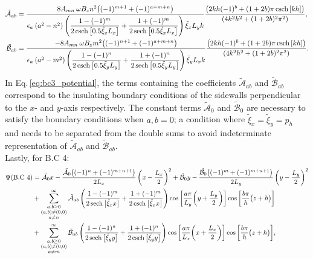 \documentclass[aps,prfluids,reprint,superscriptaddress]{revtex4-2}
\newcommand{\ii}[1]{\text{#1}}
\newcommand{\nn}{\nonumber}
\begin{document}
\begin{align}
	\tilde{\mathcal A}_{ab} & =  
	\frac{8A_{mn} \: \omega B_z n^2 \bigl( (-1)^{m+1} + (-1)^{a+m+n} \bigr)
	}
	{\epsilon_a \: (a^2-n^2)
	\left(
	\dfrac{1-(-1)^m}{2\csch{\bigl[0.5\tilde\xi_x L_x \bigr]}} + 
	\dfrac{1+(-1)^m}{2\sech{\bigl[0.5\tilde\xi_x L_x \bigr]}}
	\right)\tilde\xi_x L_y k
	}
	\frac{\left(
		2kh (-1)^b + (1+2b)\pi\csch{[kh]}
		\right)}
	{(4k^2h^2 + (1+2b)^2\pi^2)},
	\label{eq:bc3_A}
	\\
	\tilde{\mathcal B}_{ab} &= 
	\frac{-8A_{mn} \: \omega B_z m^2 \bigl( (-1)^{n+1} + (-1)^{a+m+n} \bigr)
	}
	{\epsilon_a \: (a^2-m^2)
		\left(
		\dfrac{1-(-1)^n}{2\csch{\bigl[0.5\tilde\xi_y L_y \bigr]}} + 
		\dfrac{1+(-1)^n}{2\sech{\bigl[0.5\tilde\xi_y L_y \bigr]}}
		\right)\tilde\xi_y L_x k
	}
	\frac{\left(
		2kh (-1)^b + (1+2b)\pi\csch{[kh]}
		\right)}
	{(4k^2h^2 + (1+2b)^2\pi^2)}.
	\label{eq:bc3_B}
\end{align}
In Eq.\,\eqref{eq:bc3_potential}, the terms containing the coefficients $\tilde{\mathcal A}_{ab}$ and $\tilde{\mathcal B}_{ab}$ correspond to the insulating boundary conditions of the sidewalls perpendicular to the $x$- and $y$-axis respectively. The constant terms $\tilde{\mathcal A}_0$ and $\tilde{\mathcal B}_0$ are necessary to satisfy the boundary conditions when $a,b=0$; a condition where $\tilde\xi_x=\tilde\xi_y=p_h$ and needs to be separated from the double sums to avoid indeterminate representation of $\tilde{\mathcal A}_{ab}$ and $\tilde{\mathcal B}_{ab}$.
\\
\indent Lastly, for B.C 4:
\begin{align}
	\nn
	\Psi (\ii{B.C 4})&= 
	\ddot{\mathcal A}_0x - \frac{\ddot{\mathcal A}_0 \bigl( (-1)^n + (-1)^{m+n+1} \bigr) }{2L_x}
	\left(x- \frac{L_x}{2}\right)^2
	+
	\ddot{\mathcal B}_0y - \frac{\ddot{\mathcal B}_0 \bigl( (-1)^m + (-1)^{m+n+1} \bigr) }{2L_y}
	\left(y- \frac{L_y}{2}\right)^2
	\\
	\nn
	&+
	\sum_{\substack{a, b \geq 0 \\ (a,b) 
			\neq (0,0) \\
		a\neq n	
	}}^{\infty}
	\ddot{\mathcal A}_{ab} 
	\left(
	\frac{1-(-1)^m}{2\sech{\bigl[ \ddot\xi_x x \bigr]}} + \frac{1+(-1)^m}{2\csch{\bigl[ \ddot\xi_x x \bigr]}}
	\right)
	\cos{\biggl[ \frac{a\pi}{L_y}\biggl(y + \frac{L_y}{2}\biggr)\biggr]}
	\cos{\biggl[ \frac{b\pi}{h}\bigl(z +  h\bigr)\biggr]} 
	\\
	&+
	\sum_{\substack{a, b \geq 0 \\ (a,b) 
			\neq (0,0) \\
			a\neq m	
	}}^{\infty}
	\ddot{\mathcal B}_{ab} 
	\left(
	\frac{1-(-1)^n}{2\sech{\bigl[ \ddot\xi_y y \bigr]}} + \frac{1+(-1)^n}{2\csch{\bigl[ \ddot\xi_y y \bigr]}}
	\right)
	\cos{\biggl[ \frac{a\pi}{L_x}\biggl(x + \frac{L_x}{2}\biggr)\biggr]}
	\cos{\biggl[ \frac{b\pi}{h}\bigl(z +  h\bigr)\biggr]}
	,
	\label{eq:bc4_potential}
\end{align}
\end{document}
